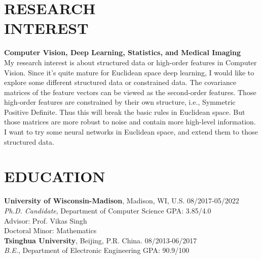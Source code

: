 \documentclass[margin]{res}
\begin{document}
\begin{resume}
\vspace{-2em}
\section{RESEARCH \\ INTEREST}
                \textbf{Computer Vision, Deep Learning, Statistics, and Medical Imaging}\\
                My research interest is about structured data or high-order features in Computer Vision. Since it's quite mature for Euclidean space deep learning, I would like to explore some different structured data or constrained data. The covariance matrices of the feature vectors can be viewed as the second-order features. Those high-order features are constrained by their own structure, i.e., Symmetric Positive Definite. Thus this will break the basic rules in Euclidean space. But those matrices are more robust to noise and contain more high-level information. I want to try some neural networks in Euclidean space, and extend them to those structured data.
                
\vspace{-1em}
\section{EDUCATION} 
                {\bf University of Wisconsin-Madison}, Madison, WI, U.S. \hfill 08/2017-05/2022\\
                {\sl {Ph.D. Candidate}}, Department of Computer Science \hfill GPA: 3.85/4.0\\
                {Advisor:} Prof. Vikas Singh\\
                {Doctoral Minor:} Mathematics\\
                {\bf Tsinghua University}, Beijing, P.R. China. \hfill 08/2013-06/2017\\
                {\sl {B.E.}}, Department of Electronic Engineering \hfill GPA: 90.9/100

\vspace{-1em}                

\end{resume}
\end{document}
